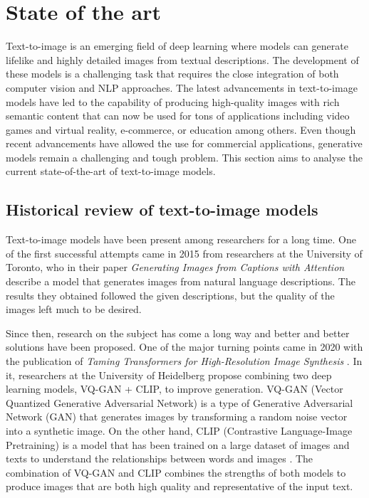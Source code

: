 \chapter{State of the art} \label{sec:stateofArt}

Text-to-image is an emerging field of deep learning where models can generate lifelike and highly detailed images from textual descriptions. The development of these models is a challenging task that requires the close integration of both computer vision and NLP approaches. The latest advancements in text-to-image models have led to the capability of producing high-quality images with rich semantic content that can now be used for tons of applications including video games and virtual reality, e-commerce, or education among others. Even though recent advancements have allowed the use for commercial applications, generative models remain a challenging and tough problem. This section aims to analyse the current state-of-the-art of text-to-image models.

\section{Historical review of text-to-image models} \label{Hreview}

Text-to-image models have been present among researchers for a long time. One of the first successful attempts came in 2015 from researchers at the University of Toronto, who in their paper \textit{Generating Images from Captions with Attention} \cite{mansimov2015generating} describe a model that generates images from natural language descriptions. The results they obtained followed the given descriptions, but the quality of the images left much to be desired. 

Since then, research on the subject has come a long way and better and better solutions have been proposed. One of the major turning points came in 2020 with the publication of \textit{Taming Transformers for High-Resolution Image Synthesis} \cite{esser2021taming}. In it, researchers at the University of Heidelberg propose combining two deep learning models, VQ-GAN + CLIP, to improve generation. VQ-GAN (Vector Quantized Generative Adversarial Network) is a type of Generative Adversarial Network (GAN) \cite{goodfellow2020generative} that generates images by transforming a random noise vector into a synthetic image. On the other hand, CLIP (Contrastive Language-Image Pretraining) is a model that has been trained on a large dataset of images and texts to understand the relationships between words and images \cite{radford2021learning}. The combination of VQ-GAN and CLIP combines the strengths of both models to produce images that are both high quality and representative of the input text. 

